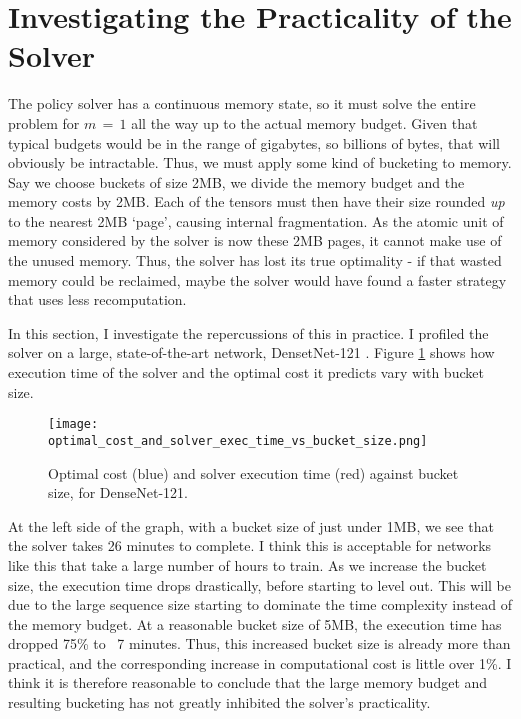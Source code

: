 \section{Investigating the Practicality of the Solver}
The policy solver has a continuous memory state, so it must solve the entire problem for \(m\,=\,1\) all the way up to the actual memory budget.
Given that typical budgets would be in the range of gigabytes, so billions of bytes, that will obviously be intractable.
Thus, we must apply some kind of bucketing to memory.
Say we choose buckets of size 2MB, we divide the memory budget and the memory costs by 2MB.
Each of the tensors must then have their size rounded \textit{up} to the nearest 2MB `page', causing internal fragmentation.
As the atomic unit of memory considered by the solver is now these 2MB pages, it cannot make use of the unused memory.
Thus, the solver has lost its true optimality - if that wasted memory could be reclaimed, maybe the solver would have found a faster strategy that uses less recomputation.

In this section, I investigate the repercussions of this in practice.
I profiled the solver on a large, state-of-the-art network, DensetNet-121 \cite{Huang2017-densenet}.
Figure \ref{fig:4-bucket-size} shows how execution time of the solver and the optimal cost it predicts vary with bucket size.

\begin{figure}[h]
    \centering
    \texttt{[image: optimal\_cost\_and\_solver\_exec\_time\_vs\_bucket\_size.png]}
    \caption{Optimal cost (blue) and solver execution time (red) against bucket size, for DenseNet-121.}
    \label{fig:4-bucket-size}
\end{figure}

At the left side of the graph, with a bucket size of just under 1MB, we see that the solver takes 26 minutes to complete.
I think this is acceptable for networks like this that take a large number of hours to train.
As we increase the bucket size, the execution time drops drastically, before starting to level out.
This will be due to the large sequence size starting to dominate the time complexity instead of the memory budget.
At a reasonable bucket size of 5MB, the execution time has dropped 75\% to ~7 minutes.
Thus, this increased bucket size is already more than practical, and the corresponding increase in computational cost is little over 1\%.
I think it is therefore reasonable to conclude that the large memory budget and resulting bucketing has not greatly inhibited the solver's practicality.

